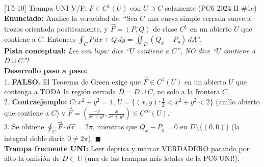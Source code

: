 \documentclass[11pt,a4paper]{article}
\begin{document}
\begin{ejerciciobox}{[T5-10] Trampa UNI V/F: $F \in C^1(U)$ con $U \supset C$ solamente (PC6 2024-II \#1c)}
\textbf{Enunciado:} Analice la veracidad de: ``Sea $C$ una curva simple cerrada suave a trozos orientada positivamente, y $\vec{F}=(P,Q)$ de clase $C^1$ en un abierto $U$ que contiene a $C$. Entonces $\oint_C P\,dx + Q\,dy = \iint_D (Q_x - P_y)\,dA$''.\\[0.2cm]
\textbf{Pista conceptual:} \emph{Lee con lupa: dice ``$U$ contiene a $C$'', NO dice ``$U$ contiene a $D \cup C$''!}\\[0.2cm]
\textbf{Desarrollo paso a paso:}\\
1. \textbf{FALSO.} El Teorema de Green exige que $\vec{F} \in C^1(U)$ en un abierto $U$ que contenga a TODA la región cerrada $\overline{D} = D \cup C$, no solo a la frontera $C$.\\
2. \textbf{Contraejemplo:} $C: x^2+y^2=1$, $U = \{(x,y) : \frac{1}{2} < x^2+y^2 < 2\}$ (anillo abierto que contiene a $C$) y $\vec{F} = \left(\frac{-y}{x^2+y^2}, \frac{x}{x^2+y^2}\right) \in C^\infty(U)$.\\
3. Se obtiene $\oint_C \vec{F}\cdot d\vec{r} = 2\pi$, mientras que $Q_x - P_y = 0$ en $D \setminus \{(0,0)\}$ (la integral doble daría $0 \neq 2\pi$). $\blacksquare$\\[0.2cm]
\textbf{Trampa frecuente UNI:} Leer deprisa y marcar VERDADERO pasando por alto la omisión de $D \subset U$ (una de las trampas más letales de la PC6 UNI!).
\end{ejerciciobox}
\end{document}
